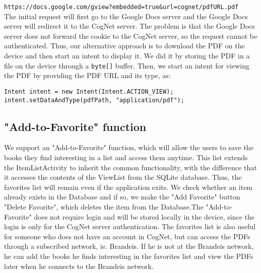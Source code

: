 \documentclass [a4paper, 11pt, oneside, final]{article}
\numberwithin{equation}{section}		%
\numberwithin{figure}{section}			%
\numberwithin{table}{section}				%
\begin{document}
{\tt https://docs.google.com/gview?embedded=true\&url=cognet/pdfURL.pdf}\\
The initial request will first go to the Google Docs server and the Google Docs server will redirect it to the CogNet server. The problem is that the Google Docs server does not forward the cookie to the CogNet server, so the request cannot be authenticated. Thus, our alternative approach is to download the PDF on the device and then start an intent to display it. We did it by storing the PDF in a file on the device through a {\tt byte[]} buffer. Then, we start an intent for viewing the PDF by providing the PDF URL and its type, as:

\begin{verbatim}
Intent intent = new Intent(Intent.ACTION_VIEW);
intent.setDataAndType(pdfPath, "application/pdf");
\end{verbatim}

\subsection{"Add-to-Favorite" function}
We support an "Add-to-Favorite" function, which will allow the users to save the books they find interesting in a list and access them anytime. This list extends the ItemListActivity to inherit the common functionality, with the difference that it accesses the contents of the ViewList from the SQLite database. Thus, the favorites list will remain even if the application exits. We check whether an item already exists in the Database and if so, we make the "Add Favorite" button "Delete Favorite", which deletes the item from the Database.The "Add-to-Favorite" does not require login and will be  stored locally in the device, since the login is only for the CogNet server authentication. The favorites list is also useful for someone who does not have an account in CogNet, but can access the PDFs through a subscribed network, ie. Brandeis. If he is not at the Brandeis network, he can add the books he finds interesting in the favorites list and view the PDFs later when he connects to the Brandeis network.



\end{document}
